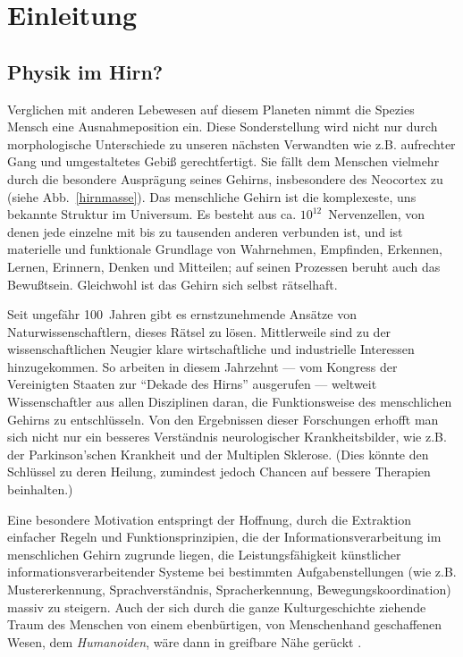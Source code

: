 \section{Einleitung}
\label{einleitung}
\thispagestyle{plain}

\subsection{Physik im Hirn?}

Verglichen mit anderen Lebewesen auf diesem Planeten nimmt die Spezies
Mensch eine Ausnahmeposition ein.  Diese Sonderstellung wird nicht nur
durch morphologische Unterschiede zu unseren nächsten Verwandten wie
z.B. aufrechter Gang und umgestaltetes Gebiß gerechtfertigt. Sie fällt
dem Menschen vielmehr durch die besondere Ausprägung seines Gehirns,
insbesondere des Neocortex zu (siehe Abb.~\ref{hirnmasse}).  Das
menschliche Gehirn ist die komplexeste, uns bekannte Struktur im Universum.
Es besteht aus ca. $10^{12}$~Nervenzellen, von denen jede einzelne mit bis
zu tausenden anderen verbunden ist, und ist materielle und funktionale
Grundlage von Wahrnehmen, Empfinden, Erkennen, Lernen, Erinnern, Denken und
Mitteilen; auf seinen Prozessen beruht auch das Bewußtsein. Gleichwohl ist
das Gehirn sich selbst rätselhaft.

Seit ungefähr 100~Jahren gibt es ernstzunehmende Ansätze von
Naturwissenschaftlern, dieses Rätsel zu lösen.  Mittlerweile sind zu der
wissenschaftlichen Neugier klare wirtschaftliche und industrielle
Interessen hinzugekommen. So arbeiten in diesem Jahrzehnt --- vom Kongress
der Vereinigten Staaten zur ``Dekade des Hirns'' ausgerufen --- weltweit
Wissenschaftler aus allen Disziplinen daran, die Funktionsweise des
menschlichen Gehirns zu entschlüsseln. Von den Ergebnissen dieser
Forschungen erhofft man sich nicht nur ein besseres Verständnis
neurologischer Krankheitsbilder, wie z.B. der Parkinson'schen Krankheit und
der Multiplen Sklerose. (Dies könnte den Schlüssel zu deren Heilung,
zumindest jedoch Chancen auf bessere Therapien beinhalten.)

Eine besondere Motivation entspringt der Hoffnung, durch die Extraktion
einfacher Regeln und Funktionsprinzipien, die der Informationsverarbeitung
im menschlichen Gehirn zugrunde liegen, die Leistungsfähigkeit
künstlicher informationsverarbeitender Systeme bei bestimmten
Aufgabenstellungen (wie z.B. Mustererkennung, Sprachverständnis,
Spracherkennung, Bewegungskoordination) massiv zu steigern. Auch der sich
durch die ganze Kulturgeschichte ziehende Traum des Menschen von einem
ebenbürtigen, von Menschenhand geschaffenen Wesen, dem \emph{Humanoiden},
wäre dann in greifbare Nähe gerückt .

